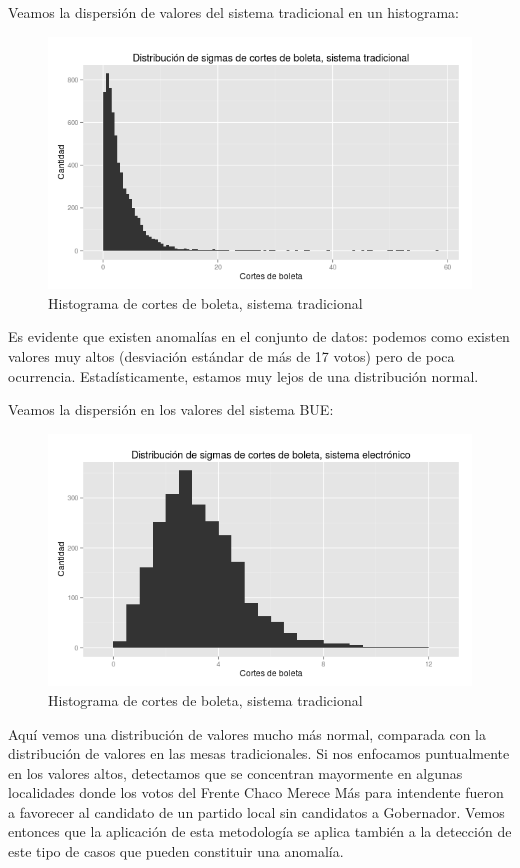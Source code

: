 \documentclass[12pt,a4paper]{article}
\begin{document}
Veamos la dispersión de valores del sistema tradicional en un histograma:

\begin{figure}[h]
\caption{Histograma de cortes de boleta, sistema tradicional}
\centering
    \includegraphics[width=\textwidth]{sigmas_tradicional}
\end{figure}

\pagebreak
Es evidente que existen anomalías en el conjunto de datos: podemos como existen
valores muy altos (desviación estándar de más de 17 votos) pero de poca
ocurrencia. Estadísticamente, estamos muy lejos de una distribución normal.

Veamos la dispersión en los valores del sistema BUE:

\begin{figure}[h]
\caption{Histograma de cortes de boleta, sistema tradicional}
\centering
    \includegraphics[width=\textwidth]{sigmas_electronico}
\end{figure}

Aquí vemos una distribución de valores mucho más normal, comparada con la
distribución de valores en las mesas tradicionales.
Si nos enfocamos puntualmente en los valores altos, detectamos que se concentran mayormente en
algunas localidades donde los votos del Frente Chaco Merece Más para intendente
fueron a favorecer al candidato de un partido local sin candidatos a Gobernador.
Vemos entonces que la aplicación de esta metodología se aplica también a la
detección de este tipo de casos que pueden constituir una anomalía. 
\end{document}
